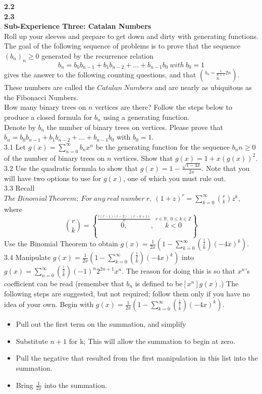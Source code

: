 \documentclass[10pt,a4paper]{report}
\begin{document}
	
	\textbf{2.2}\\
	\textbf{2.3}\\

	\textbf{Sub-Experience Three: Catalan Numbers}\\
	Roll up your sleeves and prepare to get down and dirty with generating functions.  The goal of the following sequence of problems is to prove that the sequence $(b_n)_n\geq0$ generated by the recurrence relation\\
	\[b_n = b_0b_{n-1} + b_1b_{n-2} + ... + b_{n-1}b_0\ with\ b_0 = 1\]
	gives the answer to the following counting questions, and that $b_n = \frac{1}{n+1}{2n}\choose{n}$.  These numbers are called the $Catalan\ Numbers$ and are nearly as ubiquitous as the Fibonacci Numbers.\\
	\newline
	How many binary trees on $n$ vertices are there?  Follow the steps below to produce a closed formula for $b_n$ using a generating function.\\
	 Denote by $b_n$ the number of binary trees on vertices.  Please prove that $b_n = b_0b_{n-1} + b_1b_{n-2} + ... + b_{n-1}b_0$ with $b_0 = 1$.\\
	3.1 Let $g(x) = \sum_{n=0}^{\infty}b_nx^n$ be the generating function for the sequence $b_n n\geq0$ of the number of binary trees on $n$ vertices.  Show that $g(x) = 1+x(g(x))^2$.\\
	3.2 Use the quadratic formula to show that $g(x) = 1-\frac{\sqrt{1-4x}}{2x}$. Note that you will have two options to use for $g(x)$, one of which you must rule out.\\
	3.3 Recall $The\ Binomial\ Theorem:\ For\ any\ real\ number\ r,\ (1+z)^r = \sum_{k=0}^{\infty}\binom{r}{k}z^k$, where 
	\[\binom{r}{k} = \left \lbrace \overset{\frac{r(r-1)(r-2)...(r-k+1)}{k!}}{0,},\ \overset{r\in\mathbb{R},\ 0\leq k\in\mathbb{Z}}{k<0} \right \rbrace \]
	Use the Binomial Theorem to obtain $g(x) = \frac{1}{2x}(1-\sum_{k=0}^{\infty}\binom{\frac{1}{2}}{k}(-4x)^k)$.\\
	3.4 Manipulate $g(x) = \frac{1}{2x}(1-\sum_{k=0}^{\infty}\binom{\frac{1}{2}}{k}(-4x)^k)$ into $g(x) = \sum_{n=0}^{\infty}\binom{\frac{1}{2}}{k}(-1)^n2^{2n+1}x^n$.  The reason for doing this is so that $x^n$'s coefficient can be read (remember that $b_n$ is defined to be$ [x^n]g(x)$.)  The following steps are suggested, but not required; follow them only if you have no idea of your own.  Begin with $g(x) = \frac{1}{2x}(1-\sum_{k=0}^{\infty}\binom{\frac{1}{2}}{k}(-4x)^k)$.\\
	\begin{itemize}
		\item Pull out the first term on the summation,  and simplify
		\item Substitute $n+1$ for k;  This will allow the summation to begin at zero.
		\item Pull the negative that resulted from the first manipulation in this list into the summation. 
		\item Bring $\frac{1}{2x}$ into the summation.\\
	\end{itemize}
	
\end{document}

